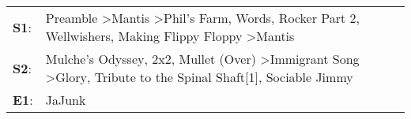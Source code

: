 \begin{supertabular}{p{0.03\textwidth}p{0.92\textwidth}}
 \textbf{S1}:  &  Preamble\textsuperscript{} \textgreater \enspace Mantis\textsuperscript{} \textgreater \enspace Phil's Farm\textsuperscript{}, \enspace Words\textsuperscript{}, \enspace Rocker Part 2\textsuperscript{}, \enspace Wellwishers\textsuperscript{}, \enspace Making Flippy Floppy\textsuperscript{} \textgreater \enspace Mantis\textsuperscript{}  \enspace  \\
 \textbf{S2}:  &                            Mulche's Odyssey\textsuperscript{}, \enspace 2x2\textsuperscript{}, \enspace Mullet (Over)\textsuperscript{} \textgreater \enspace Immigrant Song\textsuperscript{} \textgreater \enspace Glory\textsuperscript{}, \enspace Tribute to the Spinal Shaft[1]\textsuperscript{}, \enspace Sociable Jimmy\textsuperscript{}  \enspace  \\
 \textbf{E1}:  &                                                                                                                                                                                                                                                                                                                           JaJunk\textsuperscript{}  \enspace  \\
\end{supertabular}

